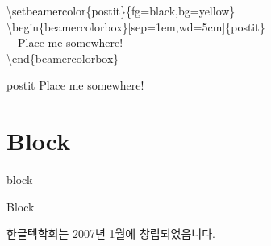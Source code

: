 \documentclass[10pt,blue,xcolor=pdftex,dvipsnames,table,handout]{beamer}
\begin{document}
		\begin{frame}

			\begin{example}
				\textbackslash setbeamercolor\{postit\}\{fg=black,bg=yellow\} \\
				\textbackslash begin\{beamercolorbox\}[sep=1em,wd=5cm]\{postit\} \\
				~~Place me somewhere! \\
				\textbackslash end\{beamercolorbox\}\\
			\end{example}


			\begin{beamercolorbox}[sep=1em,wd=5cm]{postit}
			Place me somewhere!
			\end{beamercolorbox}

		\end{frame}




		\begin{frame}[plain] \end{frame}




		\section{Block}




		\begin{frame}[plain]
		\centering
		\scalebox{10}{Block}
		\end{frame}




		


		\begin{frame}{block}

			\begin{block} {Block}
			\end{block}

			\begin{block} {}
			한글텍학회는 2007년 1월에 창립되었읍니다.	
			\end{block}

		\end{frame}
\end{document}
